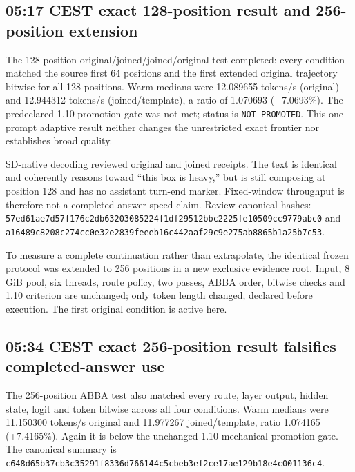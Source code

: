 \subsection{05:17 CEST exact 128-position result and 256-position extension}
The 128-position original/joined/joined/original test completed: every
condition matched the source first 64 positions and the first extended
original trajectory bitwise for all 128 positions. Warm medians were
12.089655 tokens/s (original) and 12.944312 tokens/s (joined/template),
a ratio of 1.070693 (+7.0693\%). The predeclared 1.10 promotion gate was not
met; status is \texttt{NOT\_PROMOTED}. This one-prompt adaptive result
neither changes the unrestricted exact frontier nor establishes broad quality.

SD-native decoding reviewed original and joined receipts. The text is
identical and coherently reasons toward ``this box is heavy,'' but is still
composing at position 128 and has no assistant turn-end marker. Fixed-window
throughput is therefore not a completed-answer speed claim. Review canonical
hashes: \texttt{57ed61ae7d57f176c2db63203085224f1df29512bbc2225fe10509cc9779abc0}
and \texttt{a16489c8208c274cc0e32e2839feeeb16c442aaf29c9e275ab8865b1a25b7c53}.

To measure a complete continuation rather than extrapolate, the identical
frozen protocol was extended to 256 positions in a new exclusive evidence
root. Input, 8 GiB pool, six threads, route policy, two passes, ABBA order,
bitwise checks and 1.10 criterion are unchanged; only token length changed,
declared before execution. The first original condition is active here.

\subsection{05:34 CEST exact 256-position result falsifies completed-answer use}
The 256-position ABBA test also matched every route, layer output, hidden
state, logit and token bitwise across all four conditions. Warm medians were
11.150300 tokens/s original and 11.977267 joined/template, ratio 1.074165
(+7.4165\%). Again it is below the unchanged 1.10 mechanical promotion gate.
The canonical summary is
\texttt{c648d65b37cb3c35291f8336d766144c5cbeb3ef2ce17ae129b18e4c001136c4}.

